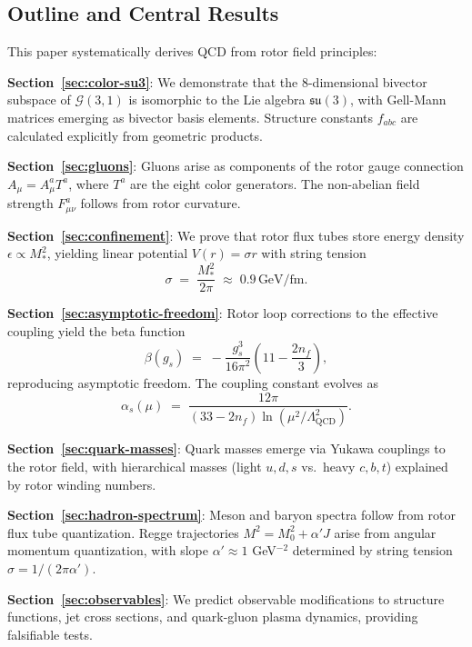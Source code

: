 \documentclass[11pt,a4paper]{article}
\newcommand{\Cl}{\mathcal{G}}
\theoremstyle{definition}
\theoremstyle{plain}
\theoremstyle{remark}
\begin{document}
\subsection{Outline and Central Results}

This paper systematically derives QCD from rotor field principles:

\textbf{Section~\ref{sec:color-su3}}: We demonstrate that the 8-dimensional bivector subspace of $\Cl(3,1)$ is isomorphic to the Lie algebra $\mathfrak{su}(3)$, with Gell-Mann matrices emerging as bivector basis elements. Structure constants $f_{abc}$ are calculated explicitly from geometric products.

\textbf{Section~\ref{sec:gluons}}: Gluons arise as components of the rotor gauge connection $A_\mu = A_\mu^a T^a$, where $T^a$ are the eight color generators. The non-abelian field strength $F_{\mu\nu}^a$ follows from rotor curvature.

\textbf{Section~\ref{sec:confinement}}: We prove that rotor flux tubes store energy density $\epsilon \propto M_\ast^2$, yielding linear potential $V(r) = \sigma r$ with string tension
\begin{equation}
\sigma \;=\; \frac{M_\ast^2}{2\pi} \;\approx\; 0.9\,\text{GeV/fm}.
\end{equation}

\textbf{Section~\ref{sec:asymptotic-freedom}}: Rotor loop corrections to the effective coupling yield the beta function
\begin{equation}
\beta(g_s) \;=\; -\frac{g_s^3}{16\pi^2}\left(11 - \frac{2n_f}{3}\right),
\end{equation}
reproducing asymptotic freedom. The coupling constant evolves as
\begin{equation}
\alpha_s(\mu) \;=\; \frac{12\pi}{(33 - 2n_f)\ln(\mu^2/\Lambda_{\mathrm{QCD}}^2)}.
\end{equation}

\textbf{Section~\ref{sec:quark-masses}}: Quark masses emerge via Yukawa couplings to the rotor field, with hierarchical masses (light $u,d,s$ vs.\ heavy $c,b,t$) explained by rotor winding numbers.

\textbf{Section~\ref{sec:hadron-spectrum}}: Meson and baryon spectra follow from rotor flux tube quantization. Regge trajectories $M^2 = M_0^2 + \alpha' J$ arise from angular momentum quantization, with slope $\alpha' \approx 1$ GeV$^{-2}$ determined by string tension $\sigma = 1/(2\pi\alpha')$.

\textbf{Section~\ref{sec:observables}}: We predict observable modifications to structure functions, jet cross sections, and quark-gluon plasma dynamics, providing falsifiable tests.
\end{document}
